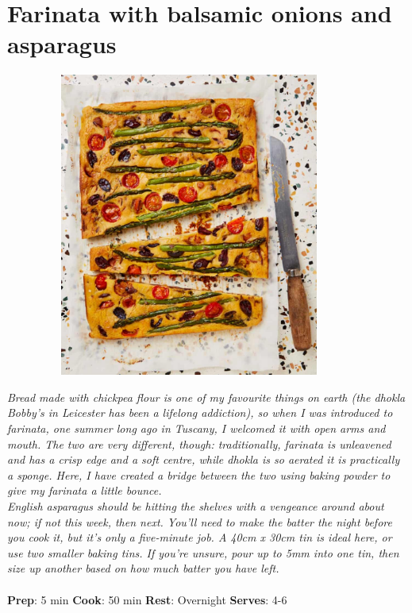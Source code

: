 \documentclass{book}
\begin{document}
\section{Farinata with balsamic onions and asparagus}
\begin{figure}
\centering\includegraphics[width=10cm,height=10cm,keepaspectratio]{Recipe_Pictures/Farinata_with_balsamic_onions_and_asparagus.png}
\end{figure}
\emph{Bread made with chickpea flour is one of my favourite things on earth (the dhokla Bobby’s in Leicester has been a lifelong addiction), so when I was introduced to farinata, one summer long ago in Tuscany, I welcomed it with open arms and mouth. The two are very different, though: traditionally, farinata is unleavened and has a crisp edge and a soft centre, while dhokla is so aerated it is practically a sponge. Here, I have created a bridge between the two using baking powder to give my farinata a little bounce.\\ 
English asparagus should be hitting the shelves with a vengeance around about now; if not this week, then next. You’ll need to make the batter the night before you cook it, but it’s only a five-minute job. A 40cm x 30cm tin is ideal here, or use two smaller baking tins. If you’re unsure, pour up to 5mm into one tin, then size up another based on how much batter you have left.}\\\\ 
\textbf{Prep}: 5 min
\textbf{Cook}: 50 min
\textbf{Rest}: Overnight
\textbf{Serves}: 4-6
\end{document}
